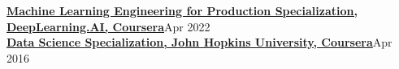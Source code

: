 \documentclass[10pt]{article}
\newenvironment{innerlist}[1][\enskip\textbullet]%
        {\begin{itemize}[#1,leftmargin=*,parsep=0pt,itemsep=0pt,topsep=0pt,partopsep=0pt]}
        {\end{itemize}}
\begin{document}
{\begin{minipage}[t]{\textwidth+\marginparwidth+\marginparsep}
        \vspace{.1in}
        {\bf \href{https://www.coursera.org/specializations/machine-learning-engineering-for-production-mlops}{Machine Learning Engineering for Production Specialization, DeepLearning.AI, Coursera}}\hfill{Apr 2022}\\

        \vspace{-.1in}
        {\bf \href{https://www.coursera.org/account/accomplishments/specialization/YP6NMPR4X3M9}{Data Science Specialization, John Hopkins University, Coursera}}\hfill{Apr 2016}\\[-0.1in]

    \end{minipage}
}\\[.15\baselineskip]

\newpage

\end{document}
